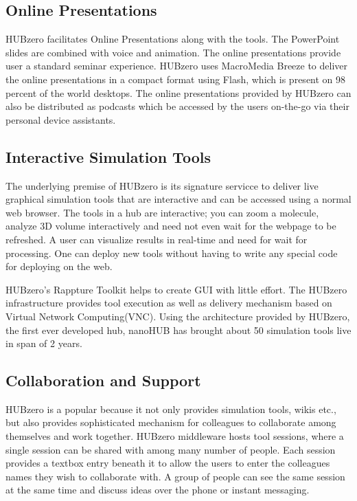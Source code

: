 \documentclass[9pt,twocolumn,twoside]{../../styles/osajnl}
\begin{document}
\subsection{Online Presentations}
HUBzero facilitates Online Presentations along with the tools. The
PowerPoint slides are combined with voice and animation. The online
presentations provide user a standard seminar experience. HUBzero uses
MacroMedia Breeze to deliver the online presentations in a compact
format using Flash, which is present on 98 percent of the world
desktops. The online presentations provided by HUBzero can also be
distributed as podcasts which be accessed by the users on-the-go via
their personal device assistants\cite{hubzerofeatures}.

\subsection{Interactive Simulation Tools}
The underlying premise of HUBzero is its signature servicce to deliver
live graphical simulation tools that are interactive and can be
accessed using a normal web browser. The tools in a hub are
interactive; you can zoom a molecule, analyze 3D volume interactively
and need not even wait for the webpage to be refreshed. A user can
visualize results in real-time and need for wait for processing. One
can deploy new tools without having to write any special code for
deploying on the web\cite{hubzerofeatures}.

HUBzero's Rappture Toolkit helps to create GUI with little effort. The
HUBzero infrastructure provides tool execution as well as delivery
mechanism based on Virtual Network Computing(VNC). Using the
architecture provided by HUBzero, the first ever developed hub,
nanoHUB has brought about 50 simulation tools live in span of 2 years.

\subsection{Collaboration and Support}
HUBzero is a popular because it not only provides simulation tools,
wikis etc., but also provides sophisticated mechanism for colleagues
to collaborate among themselves and work together. HUBzero middleware
hosts tool sessions, where a single session can be shared with among
many number of people. Each session provides a textbox entry beneath
it to allow the users to enter the colleagues names they wish to
collaborate with.  A group of people can see the same session at the
same time and discuss ideas over the phone or instant messaging\cite{hubzerofeatures}.
\end{document}
